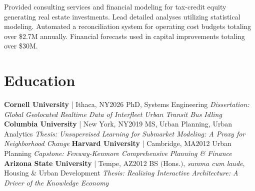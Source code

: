 \documentclass{article}
\begin{document}
\begin{bgbox}[
        height = \paperheight,
        width = 0.69\textwidth,
        colback = white
    ]
{                Provided consulting services and financial modeling for tax-credit equity generating real estate investments. Lead detailed analyses utilizing statistical modeling. Automated a reconciliation system for operating cost budgets totaling over \$2.7M annually. Financial forecasts used in capital improvements totaling over \$30M.
            \section*{Education}
                \textbf{Cornell University} | Ithaca, NY\hfill{2026}\newline
                        PhD, Systems Engineering\newline
                            \textit{Dissertation: Global Geolocated Realtime Data of Interfleet Urban Transit Bus Idling}\newline\newline
                \textbf{Columbia University} | New York, NY\hfill{2019}\newline
                        MS, Urban Planning, Urban Analytics\newline
                            \textit{Thesis: Unsupervised Learning for Submarket Modeling: A Proxy for Neighborhood Change}\newline\newline
                \textbf{Harvard University} | Cambridge, MA\hfill{2012}\newline
                        Urban Planning\newline
                            \textit{Capstone: Fenway-Kenmore Comprehensive Planning \& Finance}\newline\newline
                \textbf{Arizona State University} | Tempe, AZ\hfill{2012}\newline 
                        BS $($Hons.$)$, \textit{summa cum laude}, Housing \& Urban Development\newline
                            \textit{Thesis: Realizing Interactive Architecture: A Driver of the Knowledge Economy}
}
\end{bgbox}
\end{document}
